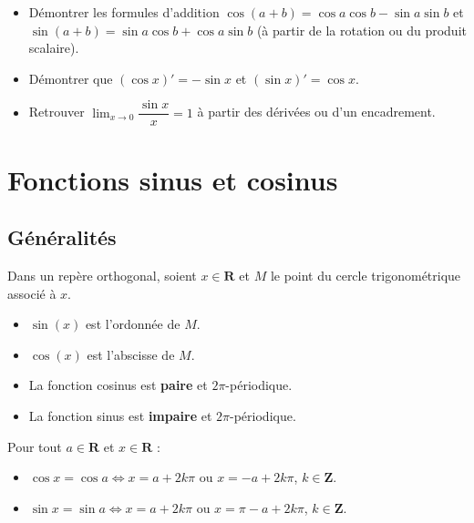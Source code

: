 \documentclass[11pt,a4paper,openany]{book}
\theoremstyle{definition}
\begin{document}
    \begin{demoprogbox}
    \begin{itemize}
        \item Démontrer les formules d'addition $\cos(a+b)=\cos a\cos b-\sin a\sin b$
              et $\sin(a+b)=\sin a\cos b+\cos a\sin b$ (à partir de la rotation ou du produit scalaire).
        \item Démontrer que $(\cos x)'=-\sin x$ et $(\sin x)'=\cos x$.
        \item Retrouver $\displaystyle\lim_{x\to 0}\dfrac{\sin x}{x}=1$ à partir des dérivées ou d'un encadrement.
    \end{itemize}
    \end{demoprogbox}

    \section{Fonctions sinus et cosinus}
    \subsection{Généralités}
    \begin{Définition}
        Dans un repère orthogonal, soient $x\in\mathbf{R}$ et $M$ le point du cercle
        trigonométrique associé à $x$.
        \begin{itemize}
            \item $\sin(x)$ est l'ordonnée de $M$.
            \item $\cos(x)$ est l'abscisse de $M$.
        \end{itemize}
    \end{Définition}

    \begin{Propriété}
        \begin{itemize}
            \item La fonction cosinus est \textbf{paire} et $2\pi$-périodique.
            \item La fonction sinus est \textbf{impaire} et $2\pi$-périodique.
        \end{itemize}
    \end{Propriété}

    \begin{Propriété}
        Pour tout $a\in\mathbf{R}$ et $x\in\mathbf{R}$ :
        \begin{itemize}
            \item $\cos x=\cos a \Longleftrightarrow x=a+2k\pi$ ou $x=-a+2k\pi$,
                  $k\in\mathbf{Z}$.
            \item $\sin x=\sin a \Longleftrightarrow x=a+2k\pi$ ou $x=\pi-a+2k\pi$,
                  $k\in\mathbf{Z}$.
        \end{itemize}
    \end{Propriété}
\end{document}

